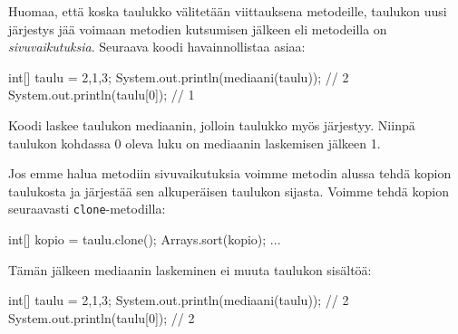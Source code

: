 Huomaa, että koska taulukko välitetään viittauksena metodeille,
taulukon uusi järjestys jää voimaan metodien kutsumisen jälkeen
eli metodeilla on \emph{sivuvaikutuksia}.
Seuraava koodi havainnollistaa asiaa:

\begin{code}
int[] taulu = {2,1,3};
System.out.println(mediaani(taulu)); // 2
System.out.println(taulu[0]); // 1
\end{code}

Koodi laskee taulukon mediaanin, jolloin taulukko
myös järjestyy. Niinpä taulukon kohdassa 0 oleva luku
on mediaanin laskemisen jälkeen 1.

Jos emme halua metodiin sivuvaikutuksia voimme metodin
alussa tehdä kopion taulukosta ja järjestää sen alkuperäisen
taulukon sijasta. Voimme tehdä kopion seuraavasti \texttt{clone}-metodilla:

\begin{code}
int[] kopio = taulu.clone();
Arrays.sort(kopio);
...
\end{code}

Tämän jälkeen mediaanin laskeminen ei
muuta taulukon sisältöä:

\begin{code}
int[] taulu = {2,1,3};
System.out.println(mediaani(taulu)); // 2
System.out.println(taulu[0]); // 2
\end{code}
